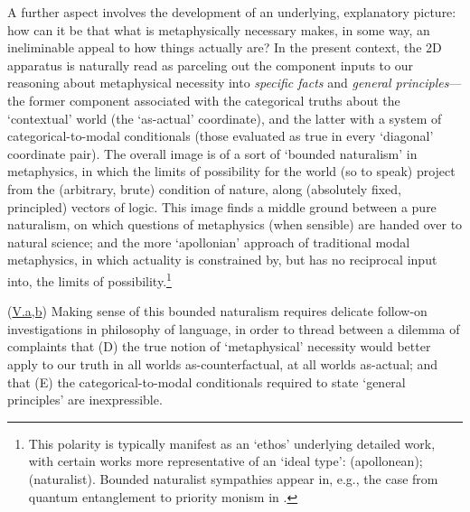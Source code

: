\documentclass[12pt]{article}
\begin{document}
A further aspect involves the development of an underlying, explanatory
picture: how can it be that what is metaphysically necessary makes, in some
way, an ineliminable appeal to how things actually are? In the present
context, the 2D apparatus is naturally read as parceling out the component
inputs to our reasoning about metaphysical necessity into \emph{specific
facts} and \emph{general principles}---the former component associated with
the categorical truths about the `contextual' world (the `as-actual'
coordinate), and the latter with a system of categorical-to-modal conditionals
(those evaluated as true in every `diagonal' coordinate pair). The overall
image is of a sort of `bounded naturalism' in metaphysics, in which the limits
of possibility for the world (so to speak) project from the (arbitrary, brute)
condition of nature, along (absolutely fixed, principled) vectors of logic.
This image finds a middle ground between a pure naturalism, on which questions
of metaphysics (when sensible) are handed over to natural science; and the
more `apollonian' approach of traditional modal metaphysics, in which
actuality is constrained by, but has no reciprocal input into, the limits of
possibility.\footnote{This polarity is typically manifest as an `ethos'
underlying detailed work, with certain works more representative of an `ideal
type': \citep{Fine2011-FINWIM,Hawthorne2011-HAWHMA,williamson13} (apollonean);
\citep{Ladyman2007-LADETM,Price2007-PRIQN} (naturalist). Bounded naturalist
sympathies appear in, e.g., the case from quantum entanglement to priority
monism in \citep{Schaffer2010-SCHMTP-2}.}

\smallskip{}

(\ul{V.a,b}) Making sense of this bounded naturalism requires delicate follow-on
investigations in philosophy of language, in order to thread between a dilemma
of complaints that (D) the true notion of `metaphysical' necessity would
better apply to our truth in all worlds as-counterfactual, at all worlds
as-actual; and that (E) the categorical-to-modal conditionals required to
state `general principles' are inexpressible.
\end{document}
